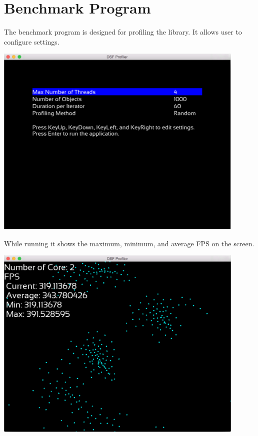 \hypertarget{_project_description_ProjectDescriptionBenchmarkProgram}{}\section{Benchmark Program}\label{_project_description_ProjectDescriptionBenchmarkProgram}
The benchmark program is designed for profiling the library. It allows user to configure settings. 
\begin{DoxyImageNoCaption}
  \mbox{\includegraphics[width=12cm]{ReportDescriptionBenchmark.png}}
\end{DoxyImageNoCaption}
 While running it shows the maximum, minimum, and average F\+P\+S on the screen. 
\begin{DoxyImageNoCaption}
  \mbox{\includegraphics[width=12cm]{ReportDescriptionBenchmarkRunning.png}}
\end{DoxyImageNoCaption}
